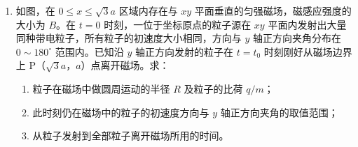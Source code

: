 \documentclass[\gkver]{gaokaozhenti}
\begin{document}
\begin{enumerate}
{则有 $m\omega^{2}r = M\omega^{2}R$，$r + R = L$，解得 $R = \frac{m}{m + M}L$，$r = \frac{M}{m + M}L$。

对 A 根据牛顿第二定律和万有引力定律得

$\frac{GMm}{L^{2}} = m\left(\frac{2\pi}{T}\right)^{2}\frac{M}{M + m}L$ ①

化简得

$T = 2\pi\sqrt{\frac{L^{3}}{G(M + m)}}$ ②

（2）将地月看成双星，由①得

$T_{1} = 2\pi\sqrt{\frac{L^{3}}{G(M + m)}}$ ③

将月球看作绕地心做圆周运动，根据牛顿第二定律和万有引力定律得

$\frac{GMm}{L^{2}} = m\left(\frac{2\pi}{T}\right)^{2}L$ ④

化简得

$T_{2} = 2\pi\sqrt{\frac{L^{3}}{GM}}$ ⑤

所以两种周期的平方比值为

$\left(\frac{T_{2}}{T_{1}}\right)^{2} = \frac{m + M}{M} = \frac{5.98\times10^{24} + 7.35\times10^{22}}{5.98\times10^{24}} = 1.012$
}

\item
如图，在 $0\leq x\leq\sqrt{3}a$ 区域内存在与 $xy$ 平面垂直的匀强磁场，磁感应强度的大小为 $B$。在 $t = 0$ 时刻，一位于坐标原点的粒子源在 $xy$ 平面内发射出大量同种带电粒子，所有粒子的初速度大小相同，方向与 $y$ 轴正方向夹角分布在 $0\sim180^\circ$ 范围内。已知沿 $y$ 轴正方向发射的粒子在 $t = t_{0}$ 时刻刚好从磁场边界上 P（$\sqrt{3}a$，$a$）点离开磁场。求：

\begin{enumerate}
	\item
	粒子在磁场中做圆周运动的半径 $R$ 及粒子的比荷 $q/m$；

	\item
	此时刻仍在磁场中的粒子的初速度方向与 $y$ 轴正方向夹角的取值范围；

	\item
	从粒子发射到全部粒子离开磁场所用的时间。

\end{enumerate}
\end{enumerate}
\end{document}
